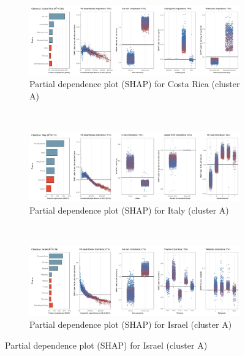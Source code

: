 \begin{figure}[ht!]\ContinuedFloat
    \centering
   \begin{subfigure}[b]{\textwidth}
         \centering
         \caption{Partial dependence plot (SHAP) for Costa Rica (cluster A)}
         \label{fig:5b_CRI}
         \includegraphics[width=\textwidth]{Figure 5b/Figure_5b_CRI}         
     \end{subfigure}
    \\
    \vspace{0.5cm}
   \begin{subfigure}[b]{\textwidth}
         \centering
         \caption{Partial dependence plot (SHAP) for Italy (cluster A)}
         \label{fig:5b_ITA}
         \includegraphics[width=\textwidth]{Figure 5b/Figure_5b_ITA}         
     \end{subfigure}
    \\
    \vspace{0.5cm}
   \begin{subfigure}[b]{\textwidth}
         \centering
         \caption{Partial dependence plot (SHAP) for Israel (cluster A)}
         \label{fig:5b_ISR}
         \includegraphics[width=\textwidth]{Figure 5b/Figure_5b_ISR}

\end{subfigure}
\end{figure}
